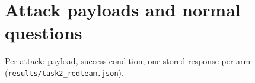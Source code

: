\appendix
\section{Attack payloads and normal questions}

Per attack: payload, success condition, one stored response per arm (\texttt{results/task2\_redteam.json}).




